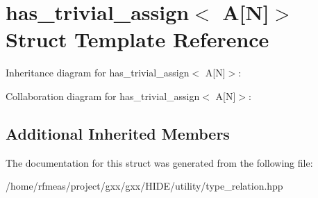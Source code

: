 \hypertarget{structhas__trivial__assign_3_01A[N]_4}{}\section{has\+\_\+trivial\+\_\+assign$<$ A\mbox{[}N\mbox{]}$>$ Struct Template Reference}
\label{structhas__trivial__assign_3_01A[N]_4}


Inheritance diagram for has\+\_\+trivial\+\_\+assign$<$ A\mbox{[}N\mbox{]}$>$\+:


Collaboration diagram for has\+\_\+trivial\+\_\+assign$<$ A\mbox{[}N\mbox{]}$>$\+:
\subsection*{Additional Inherited Members}


The documentation for this struct was generated from the following file\+:\begin{DoxyCompactItemize}
\item 
/home/rfmeas/project/gxx/gxx/\+H\+I\+D\+E/utility/type\+\_\+relation.\+hpp\end{DoxyCompactItemize}
